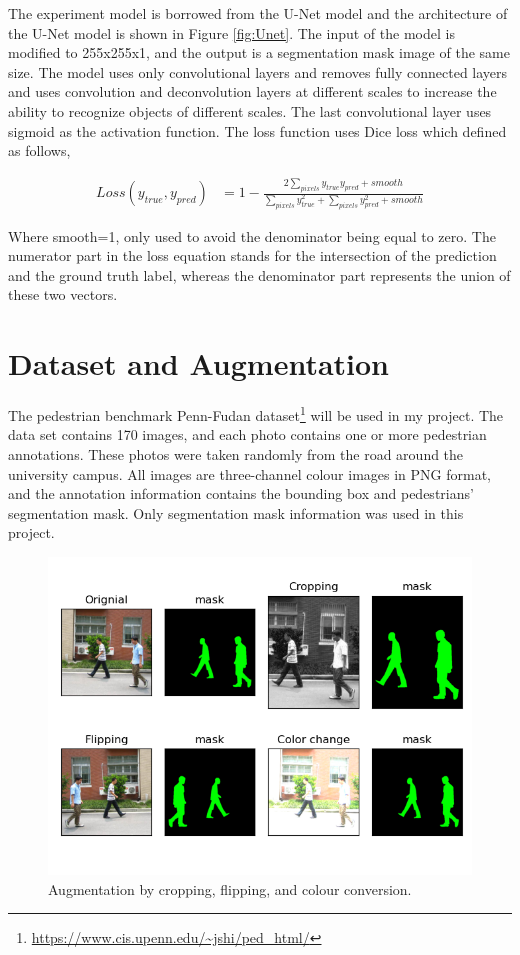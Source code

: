 \documentclass[12pt, a4paper]{article}
\begin{document}
\begin{multicols}{2}
	The experiment model is borrowed from the U-Net model and the architecture of the U-Net model is shown in Figure \ref{fig:Unet}. The input of the model is modified to 255x255x1, and the output is a segmentation mask image of the same size. The model uses only convolutional layers and removes fully connected layers and uses convolution and deconvolution layers at different scales to increase the ability to recognize objects of different scales. The last convolutional layer uses sigmoid as the activation function. The loss function uses Dice loss which defined as follows,
	\begin{normalsize} %
	\begin{align}
	Loss(y_{true}, y_{pred}) &= 1 - \frac{2\sum_{pixels}y_{true}y_{pred} + smooth }{\sum_{pixels}y_{true}^2 + \sum_{pixels}y_{pred}^2 + smooth}
	\end{align}
	\end{normalsize}
	\par
	Where smooth=1, only used to avoid the denominator being equal to zero. The numerator part in the loss equation stands for the intersection of the prediction and the ground truth label, whereas the denominator part represents the union of these two vectors.


	\section{Dataset and Augmentation} \justify
	The pedestrian benchmark Penn-Fudan dataset\footnote{\label{}\url{https://www.cis.upenn.edu/~jshi/ped_html/}} will be used in my project. The data set contains 170 images, and each photo contains one or more pedestrian annotations. These photos were taken randomly from the road around the university campus. All images are three-channel colour images in PNG format, and the annotation information contains the bounding box and pedestrians’ segmentation mask. Only segmentation mask information was used in this project.
	\begin{figure}[h!] %
       \centering
	  \includegraphics[width=0.5\linewidth]{dataset.png}
	  \caption{Augmentation by cropping, flipping, and colour conversion.}
	  \label{fig:augmentation}
	\end{figure}


\end{multicols}
\end{document}
